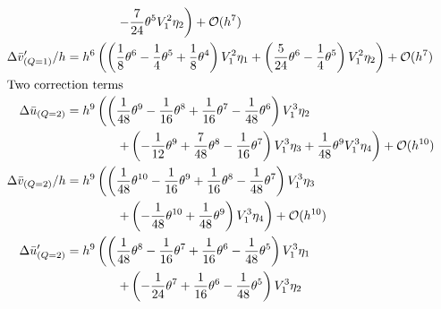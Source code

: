 \begin{align*}
                              & \qquad\qquad \left. -\frac{7}{24} \theta^{5} V_{1}^{2} \eta_{2}\right) + \mathcal{O}(h^{7})                                                                                                                                              \\
    \Delta \bar{v}'_{(Q=1)}/h & = h^{6}\left(\left(\frac{1}{8} \theta^{6} - \frac{1}{4} \theta^{5} + \frac{1}{8} \theta^{4}\right) V_{1}^{2} \eta_{1} + \left(\frac{5}{24} \theta^{6} - \frac{1}{4} \theta^{5}\right) V_{1}^{2} \eta_{2}\right) + \mathcal{O}(h^{7})     \\
    \intertext{Two correction terms}
    \Delta \bar{u}_{(Q=2)}    & = h^{9}\left(\left(\frac{1}{48} \theta^{9} - \frac{1}{16} \theta^{8} + \frac{1}{16} \theta^{7} - \frac{1}{48} \theta^{6}\right) V_{1}^{3} \eta_{2} \right.                                                                               \\
                              & \qquad\qquad \left.
    + \left(-\frac{1}{12} \theta^{9} + \frac{7}{48} \theta^{8} - \frac{1}{16} \theta^{7}\right) V_{1}^{3} \eta_{3} 											%
    +\frac{1}{48} \theta^{9} V_{1}^{3} \eta_{4}\right) + \mathcal{O}(h^{10})                                                                                                                                                                                             \\
    \Delta \bar{v}_{(Q=2)}/h  & = h^{9}\left(\left(\frac{1}{48} \theta^{10} - \frac{1}{16} \theta^{9} + \frac{1}{16} \theta^{8} - \frac{1}{48} \theta^{7}\right) V_{1}^{3} \eta_{3} \right.                                                                              \\
                              & \qquad\qquad \left. + \left(-\frac{1}{48} \theta^{10} + \frac{1}{48} \theta^{9}\right) V_{1}^{3} \eta_{4}\right) + \mathcal{O}(h^{10})                                                                                                   \\
    \Delta \bar{u}'_{(Q=2)}   & = h^{9}\left(\left(\frac{1}{48} \theta^{8} - \frac{1}{16} \theta^{7} + \frac{1}{16} \theta^{6} - \frac{1}{48} \theta^{5}\right) V_{1}^{3} \eta_{1} \right.                                                                               \\
                              & \qquad\qquad \left. + \left(-\frac{1}{24} \theta^{7} + \frac{1}{16} \theta^{6} - \frac{1}{48} \theta^{5}\right) V_{1}^{3} \eta_{2} \right.                                                                                               \\

\end{align*}
